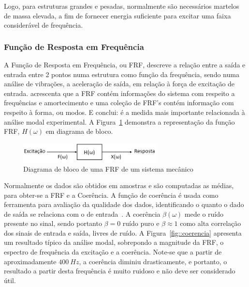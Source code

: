Logo, para estruturas grandes e pesadas, normalmente são necessários martelos de
massa elevada, a fim de fornecer energia suficiente para excitar uma faixa
considerável de frequência.


\subsubsection{Função de Resposta em Frequência}

A Função de Resposta em Frequência, ou FRF, descreve a relação entre a saída e
entrada entre 2 pontos numa estrutura como função da frequência, sendo numa
análise de vibrações, a aceleração de saída, em relação à força de excitação de
entrada. \citet{avitabile2001experimental} acrescenta que a FRF contém
informações do sistema com respeito a frequências e amortecimento e uma coleção
de FRF's contém informação com respeito à forma, ou modos. E conclui: é a medida
mais importante relacionada à análise modal experimental. A
Figura~\ref{fig::diagrama_frf} demonstra a representação da função FRF,
$H(\omega)$ em diagrama de bloco.

\begin{figure}[h]
	\centering 
 	\includegraphics[width=0.65\textwidth]{figs/diagrama_frf}
 	\caption{Diagrama de bloco de uma FRF de um sistema mecânico}
 	\label{fig::diagrama_frf}
\end{figure}

Normalmente os dados são obtidos em amostras e são computadas as médias, para
obter-se a FRF e a Coerência. A função de coerência é usada como
ferramenta para avaliação da qualidade dos dados, identificando o quanto o dado de saída se
relaciona com o de entrada~\cite{avitabile2001experimental}. A coerência
$\beta(\omega)$ mede o ruído presente no sinal, sendo portanto $\beta = 0$ ruído
puro e $\beta \approx 1$ como alta correlação dos sinais de entrada e saída,
livres de ruído. A Figura~\ref{fig::coerencia} apresenta um resultado típico da
análise modal, sobrepondo a magnitude da FRF, o espectro de frequência da
excitação e a coerência. Note-se que a partir de aproximadamente $400~Hz$, a
coerência diminiu drasticamente, e portanto, o resultado a partir desta
frequência é muito ruidoso e não deve ser considerado útil.


